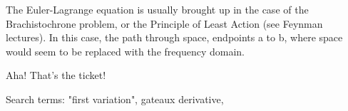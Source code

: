 \documentclass[paper.tex]{subfiles}
\begin{document}
	
	




The Euler-Lagrange equation is usually brought up in the case of the Brachistochrone problem, or the Principle of Least Action (see Feynman lectures). In this case, the path through space, endpoints a to b, where space would seem to be replaced with the frequency domain. 

Aha! That's the ticket! 

Search terms: "first variation", gateaux derivative, 
\end{document}
